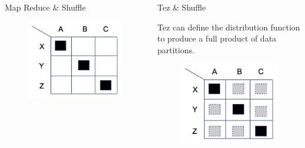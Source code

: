 \documentclass[final]{beamer}
\newlength{\onecolwid}
\newlength{\twocolwid}
\begin{document}
\begin{frame}[t]
\begin{columns}[t]
\begin{column}{\twocolwid}
\begin{columns}[t,totalwidth=\twocolwid]
\begin{column}{\onecolwid}
\begin{block}{Map Reduce \& Shuffle}
\begin{figure}
\includegraphics{figures/mr-shuffle.png}
\end{figure}

\end{block}


\end{column} %

\begin{column}{\onecolwid}\vspace{-.6in} %


\begin{block}{Tez \& Shuffle}

Tez can define the distribution function to produce a full product of data partitions.

\begin{figure}
\includegraphics{figures/X-prod-1.png}
\end{figure}


\end{block}
\end{column}
\end{columns}
\end{column}
\end{columns}
\end{frame}
\end{document}
